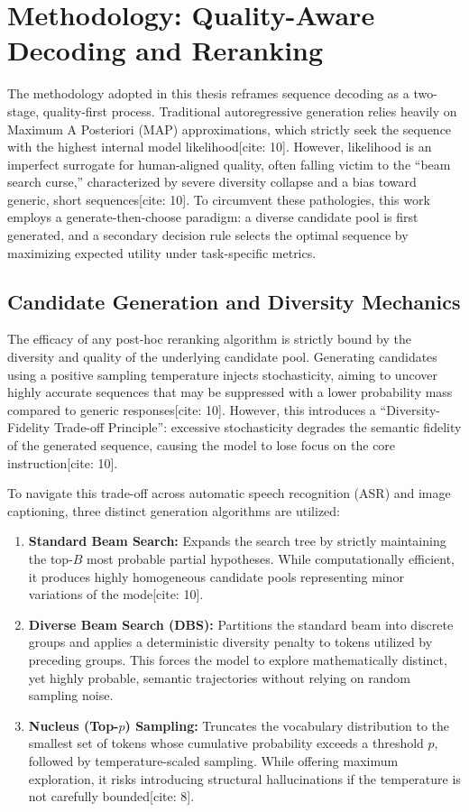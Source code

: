 \chapter{Methodology: Quality-Aware Decoding and Reranking}
\label{chapter:methodology}

The methodology adopted in this thesis reframes sequence decoding as a two-stage, quality-first process. Traditional autoregressive generation relies heavily on Maximum A Posteriori (MAP) approximations, which strictly seek the sequence with the highest internal model likelihood[cite: 10]. However, likelihood is an imperfect surrogate for human-aligned quality, often falling victim to the ``beam search curse,'' characterized by severe diversity collapse and a bias toward generic, short sequences[cite: 10]. To circumvent these pathologies, this work employs a generate-then-choose paradigm: a diverse candidate pool is first generated, and a secondary decision rule selects the optimal sequence by maximizing expected utility under task-specific metrics.

\section{Candidate Generation and Diversity Mechanics}
\label{sec:candidate_generation}

The efficacy of any post-hoc reranking algorithm is strictly bound by the diversity and quality of the underlying candidate pool. Generating candidates using a positive sampling temperature injects stochasticity, aiming to uncover highly accurate sequences that may be suppressed with a lower probability mass compared to generic responses[cite: 10]. However, this introduces a ``Diversity-Fidelity Trade-off Principle'': excessive stochasticity degrades the semantic fidelity of the generated sequence, causing the model to lose focus on the core instruction[cite: 10]. 

To navigate this trade-off across automatic speech recognition (ASR) and image captioning, three distinct generation algorithms are utilized:
\begin{enumerate}
    \item \textbf{Standard Beam Search:} Expands the search tree by strictly maintaining the top-$B$ most probable partial hypotheses. While computationally efficient, it produces highly homogeneous candidate pools representing minor variations of the mode[cite: 10].
    \item \textbf{Diverse Beam Search (DBS):} Partitions the standard beam into discrete groups and applies a deterministic diversity penalty to tokens utilized by preceding groups. This forces the model to explore mathematically distinct, yet highly probable, semantic trajectories without relying on random sampling noise.
    \item \textbf{Nucleus (Top-$p$) Sampling:} Truncates the vocabulary distribution to the smallest set of tokens whose cumulative probability exceeds a threshold $p$, followed by temperature-scaled sampling. While offering maximum exploration, it risks introducing structural hallucinations if the temperature is not carefully bounded[cite: 8].
\end{enumerate}

